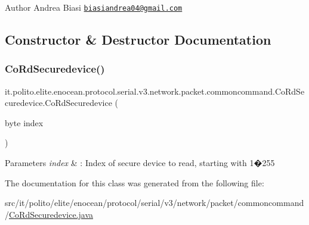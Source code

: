 \begin{DoxyAuthor}{Author}
Andrea Biasi \href{mailto:biasiandrea04@gmail.com}{\tt biasiandrea04@gmail.\+com} 
\end{DoxyAuthor}


\subsection{Constructor \& Destructor Documentation}
\hypertarget{classit_1_1polito_1_1elite_1_1enocean_1_1protocol_1_1serial_1_1v3_1_1network_1_1packet_1_1commoncommand_1_1_co_rd_securedevice_a659ac20e20444858ab35fcd0a0b15b77}{}\label{classit_1_1polito_1_1elite_1_1enocean_1_1protocol_1_1serial_1_1v3_1_1network_1_1packet_1_1commoncommand_1_1_co_rd_securedevice_a659ac20e20444858ab35fcd0a0b15b77} 
\subsubsection{\texorpdfstring{Co\+Rd\+Securedevice()}{CoRdSecuredevice()}}
{\footnotesize\ttfamily it.\+polito.\+elite.\+enocean.\+protocol.\+serial.\+v3.\+network.\+packet.\+commoncommand.\+Co\+Rd\+Securedevice.\+Co\+Rd\+Securedevice (\begin{DoxyParamCaption}\item[{byte}]{index }\end{DoxyParamCaption})}


\begin{DoxyParams}{Parameters}
{\em index} & \+: Index of secure device to read, starting with 1�255 \\
\hline
\end{DoxyParams}


The documentation for this class was generated from the following file\+:\begin{DoxyCompactItemize}
\item 
src/it/polito/elite/enocean/protocol/serial/v3/network/packet/commoncommand/\hyperlink{_co_rd_securedevice_8java}{Co\+Rd\+Securedevice.\+java}\end{DoxyCompactItemize}
